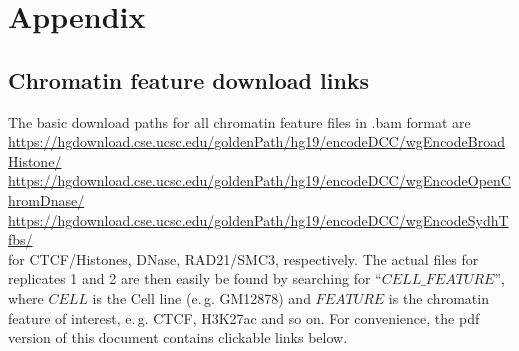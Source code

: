 \section{Appendix}

\subsection{Chromatin feature download links} \label{sec:chromFeat_download_links}
The basic download paths for all chromatin feature files in .bam format are\\
\small{\url{https://hgdownload.cse.ucsc.edu/goldenPath/hg19/encodeDCC/wgEncodeBroadHistone/}}\\
\small{\url{https://hgdownload.cse.ucsc.edu/goldenPath/hg19/encodeDCC/wgEncodeOpenChromDnase/}}\\
\small{\url{https://hgdownload.cse.ucsc.edu/goldenPath/hg19/encodeDCC/wgEncodeSydhTfbs/}}\\
for CTCF/Histones, DNase, RAD21/SMC3, respectively. 
The actual files for replicates 1 and 2 are then easily be found by searching for ``$\mathit{CELL}\_\mathit{FEATURE}$'', 
where $\mathit{CELL}$ is the Cell line (e.\,g. GM12878) and $\mathit{FEATURE}$
is the chromatin feature of interest, e.\,g. CTCF, H3K27ac and so on.
For convenience, the pdf version of this document contains clickable links below.

